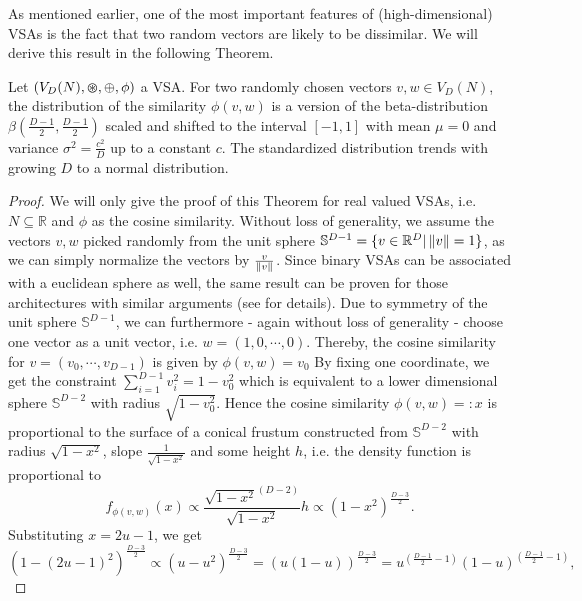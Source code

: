 As mentioned earlier, one of the most important features of (high-dimensional) \acp{VSA} is the fact that two random vectors are likely to be dissimilar.
We will derive this result in the following Theorem.
\begin{theorem}
	\label{theorem:VSA_cossim_distribution}
	Let $\left(V_{D}(N), \varoast, \oplus, \phi \right)$ a \acl{VSA}. 
	For two randomly chosen vectors $v, w \in V_{D}(N)$, the distribution of the similarity $\phi\left(v,w\right)$ is a version of the beta-distribution $\beta\left(\frac{D-1}{2},\frac{D-1}{2}\right)$ scaled and shifted to the interval $\left[-1,1\right]$ with mean $\mu=0$ and variance $\sigma^2=\frac{c^2}{D}$ up to a constant $c$. The standardized distribution trends with growing $D$ to a normal distribution.
\end{theorem}
\begin{proof}
	We will only give the proof of this Theorem for real valued \acp{VSA}, i.e. $N \subseteq \mathbb{R}$ and $\phi$ as the cosine similarity.
	Without loss of generality, we assume the vectors $v,w$ picked randomly from the unit sphere $\mathbb{S}^{D-1} = \{ v \in \mathbb{R}^{D} | \left\| v \right\| = 1 \}$, as we can simply normalize the vectors by $\frac{v}{\left\| v \right\|}$.
	Since binary \acp{VSA} can be associated with a euclidean sphere as well, the same result can be proven for those architectures with similar arguments (see \cite{Kanerva1988} for details).
	Due to symmetry of the unit sphere $\mathbb{S}^{D-1}$, we can furthermore - again without loss of generality - choose one vector as a unit vector, i.e. $w=\left(1, 0 , \cdots, 0\right)$.
	Thereby, the cosine similarity for $v=\left(v_{0}, \cdots, v_{D-1}\right)$ is given by $\phi\left(v,w\right) = v_{0}$
	By fixing one coordinate, we get the constraint $\sum_{i=1}^{D-1} v_{i}^{2} = 1-v_{0}^{2}$ which is equivalent to a lower dimensional sphere $\mathbb{S}^{D-2}$ with radius $\sqrt{1-v_{0}^2}$.
	Hence the cosine similarity $\phi\left(v,w\right)=:x$ is proportional to the surface of a conical frustum constructed from $\mathbb{S}^{D-2}$ with radius $\sqrt{1-x^{2}}$, slope $\frac{1}{\sqrt{1-x^{2}}}$ and some height $h$, i.e. the density function is proportional to
	\[
	f_{\phi(v,w)}(x) \propto \frac{\sqrt{1-x^{2}}^{(D-2)}}{\sqrt{1-x^{2}}} h \propto \left(1-x^{2}\right)^{\frac{D-3}{2}}.
	\]
	Substituting $x=2u-1$, we get 
	\[
	\left(1-\left(2u-1\right)^{2}\right)^{\frac{D-3}{2}} \propto \left(u-u^2\right)^{\frac{D-3}{2}} = \left(u \left(1-u\right)\right)^{\frac{D-3}{2}} = u^{\left(\frac{D-1}{2}-1\right)} \left(1-u\right)^{\left(\frac{D-1}{2}-1\right)},
\]
\end{proof}
